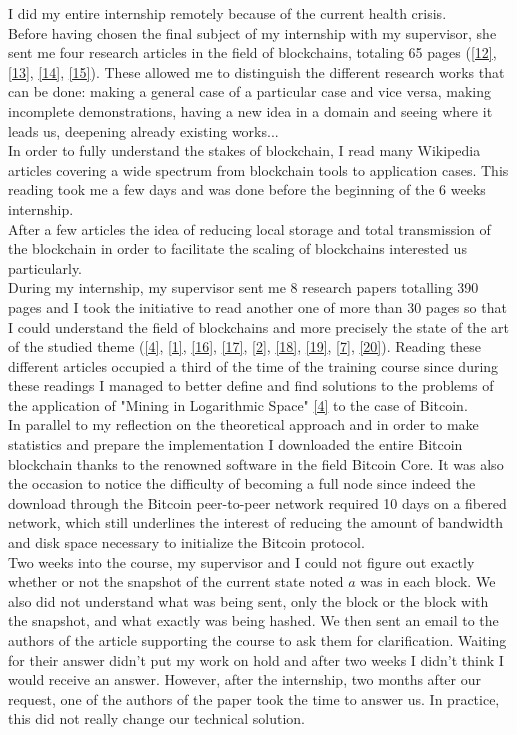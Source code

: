 \documentclass[12pt,a4paper]{article}
\newcommand{\source}[1]{\hyperlink{#1}{[#1]}}
\begin{document}
	I did my entire internship remotely because of the current health crisis.\\
	Before having chosen the final subject of my internship with my supervisor, she sent me four research articles in the field of blockchains, totaling 65 pages (\source{12}, \source{13}, \source{14}, \source{15}). These allowed me to distinguish the different research works that can be done: making a general case of a particular case and vice versa, making incomplete demonstrations, having a new idea in a domain and seeing where it leads us, deepening already existing works...\\

	In order to fully understand the stakes of blockchain, I read many Wikipedia articles covering a wide spectrum from blockchain tools to application cases. This reading took me a few days and was done before the beginning of the 6 weeks internship.\\
	After a few articles the idea of reducing local storage and total transmission of the blockchain in order to facilitate the scaling of blockchains interested us particularly.\\
	
	During my internship, my supervisor sent me 8 research papers totalling 390 pages and I took the initiative to read another one of more than 30 pages so that I could understand the field of blockchains and more precisely the state of the art of the studied theme (\source{4}, \source{1}, \source{16}, \source{17}, \source{2}, \source{18}, \source{19}, \source{7}, \source{20}). Reading these different articles occupied a third of the time of the training course since during these readings I managed to better define and find solutions to the problems of the application of "Mining in Logarithmic Space" \source{4} to the case of Bitcoin.\\
	
	In parallel to my reflection on the theoretical approach and in order to make statistics and prepare the implementation I downloaded the entire Bitcoin blockchain thanks to the renowned software in the field Bitcoin Core. It was also the occasion to notice the difficulty of becoming a full node since indeed the download through the Bitcoin peer-to-peer network required 10 days on a fibered network, which still underlines the interest of reducing the amount of bandwidth and disk space necessary to initialize the Bitcoin protocol.\\
	Two weeks into the course, my supervisor and I could not figure out exactly whether or not the snapshot of the current state noted $a$ was in each block. We also did not understand what was being sent, only the block or the block with the snapshot, and what exactly was being hashed. We then sent an email to the authors of the article supporting the course to ask them for clarification. Waiting for their answer didn't put my work on hold and after two weeks I didn't think I would receive an answer. However, after the internship, two months after our request, one of the authors of the paper took the time to answer us. In practice, this did not really change our technical solution.\\
	
\end{document}

